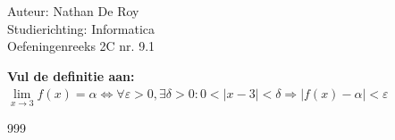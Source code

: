\documentclass[a4paper]{article}
\begin{document}
\noindent \large Auteur: Nathan De Roy \\
\noindent \large Studierichting: Informatica\\
\noindent \large Oefeningenreeks 2C nr. 9.1\\

\medskip

\normalsize

\textbf{Vul de definitie aan:}\\

$\displaystyle\lim\limits_{x \to 3} f(x) = \alpha \Leftrightarrow \forall \varepsilon > 0, \exists \delta > 0 \colon 0 <|x - 3| < \delta \Rightarrow |f(x) - \alpha| < \varepsilon$\\

\begin{thebibliography}{999}
\end{thebibliography}
\end{document}
